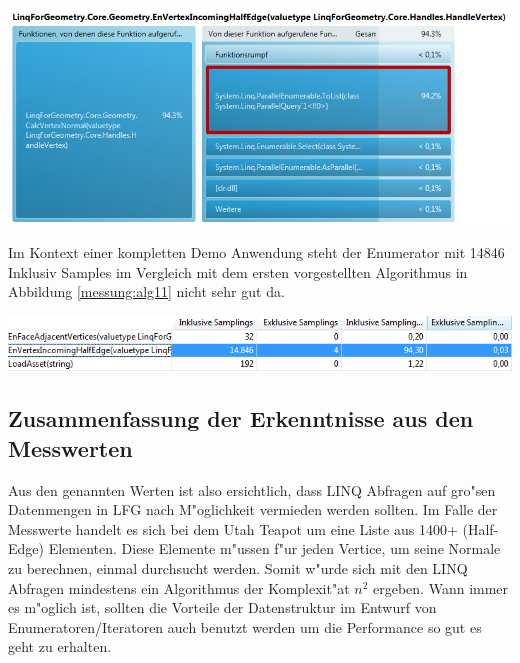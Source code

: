 \documentclass[pagesize, paper=a4, fontsize=12pt,titlepage=true, headings=small, headnosepline, abstractoff, liststotoc, nochapterprefix, plainheadsepline]{scrreprt}
\begin{document}
\begin{minipage}[c][10cm]{\linewidth}
\includegraphics[width=\linewidth]{../Messung/2-linq-envertexinche-2-0}
\label{messung:alg31}
\end{minipage}

Im Kontext einer kompletten Demo Anwendung steht der Enumerator mit 14846 Inklusiv Samples im Vergleich mit dem ersten vorgestellten Algorithmus in Abbildung \ref{messung:alg11} nicht sehr gut da.
\begin{minipage}[c][5cm]{\linewidth}
\includegraphics[width=\linewidth]{../Messung/2-linq-envertexinche-2}
\label{messung:alg32}
\end{minipage}

\subsection{Zusammenfassung der Erkenntnisse aus den Messwerten}
Aus den genannten Werten ist also ersichtlich, dass LINQ Abfragen auf gro"sen Datenmengen in LFG nach M"oglichkeit vermieden werden sollten. Im Falle der Messwerte handelt es sich bei dem Utah Teapot um eine Liste aus 1400+ (Half-Edge) Elementen. Diese Elemente m"ussen f"ur jeden Vertice, um seine Normale zu berechnen, einmal durchsucht werden. Somit w"urde sich mit den LINQ Abfragen mindestens ein Algorithmus der Komplexit"at $n^2$ ergeben. Wann immer es m"oglich ist, sollten die Vorteile der Datenstruktur im Entwurf von Enumeratoren/Iteratoren auch benutzt werden um die Performance so gut es geht zu erhalten.
\newpage
\end{document}
